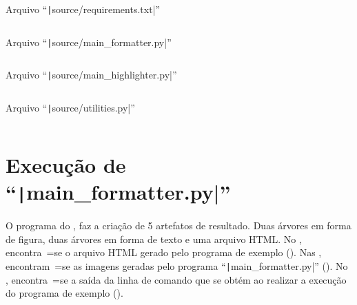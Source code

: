 \begin{code}
\caption[Arquivo ``source/requirements.txt'']{Arquivo ``\texttt|source/requirements.txt|''}
\label{code:requirementsTxt}
\inputminted{python3}{../source/requirements.txt}
\end{code}

\begin{code}
\caption[Arquivo ``source/main\_formatter.py'']{Arquivo ``\texttt|source/main_formatter.py|''}
\label{code:MainFormatterPy}
\inputminted[firstline=39,firstnumber=1]{python3}{../source/main_formatter.py}
\end{code}

\begin{code}
\caption[Arquivo ``source/main\_highlighter.py'']{Arquivo ``\texttt|source/main_highlighter.py|''}
\label{code:MainHighlighterPy}
\inputminted[firstline=39,firstnumber=1]{python3}{../source/main_highlighter.py}
\end{code}

\begin{code}
\caption[Arquivo ``source/utilities.py'']{Arquivo ``\texttt|source/utilities.py|''}
\label{code:utilitiesPy}
\inputminted[firstline=39,firstnumber=1]{python3}{../source/utilities.py}
\end{code}


\chapter[main\_formatter.py]{Execução de ``\texttt|main_formatter.py|''}
\label{chapter:execucaoDeMainFormatter}

O programa do ,
faz a criação de 5 artefatos de resultado.
Duas árvores em forma de figura,
duas árvores em forma de texto e
uma arquivo HTML.
No ,
encontra~=se o arquivo HTML gerado pelo programa de exemplo ().
Nas ,
encontram~=se as imagens geradas pelo programa ``\texttt|main_formatter.py|'' ().
No ,
encontra~=se a saída da linha de comando que se obtém ao realizar a execução do programa de exemplo ().

